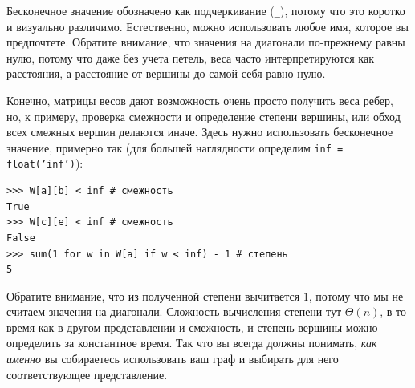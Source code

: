 Бесконечное значение обозначено как подчеркивание (\texttt{\_}), потому что это коротко и визуально различимо. Естественно, можно использовать любое имя, которое вы предпочтете. Обратите внимание, что значения на диагонали по-прежнему равны нулю, потому что даже без учета петель, веса часто интерпретируются как расстояния, а расстояние от вершины до самой себя равно нулю.

Конечно, матрицы весов дают возможность очень просто получить веса ребер, но, к примеру, проверка смежности и определение степени вершины, или обход всех смежных вершин делаются иначе. Здесь нужно использовать бесконечное значение, примерно так (для большей наглядности определим \texttt{inf = float('inf')}):
\begin{lstlisting}
>>> W[a][b] < inf # смежность
True
>>> W[c][e] < inf # смежность
False
>>> sum(1 for w in W[a] if w < inf) - 1 # степень
5
\end{lstlisting}

Обратите внимание, что из полученной степени вычитается $1$, потому что мы не считаем значения на диагонали. Сложность вычисления степени тут $\Theta(n)$, в то время как в другом представлении и смежность, и степень вершины можно определить за константное время. Так что  вы всегда должны понимать, \textit{как именно} вы собираетесь использовать ваш граф и выбирать для него соответствующее представление.

